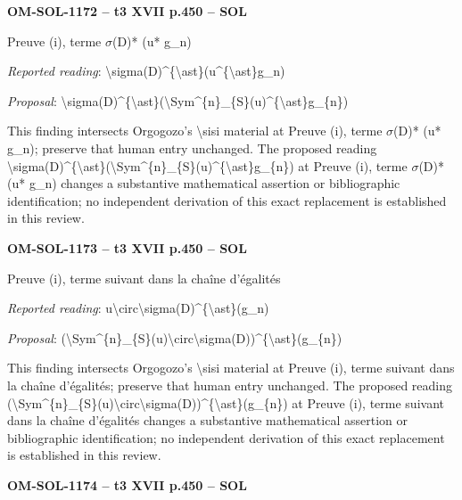 \par\noindent\textbf{OM-SOL-1172 -- t3 XVII p.450 -- SOL}\par
Preuve (i), terme \ensuremath{\sigma}(D)* (u* g\_n)\par
\emph{Reported reading}: \textbackslash{}sigma(D)\textasciicircum{}\{\textbackslash{}ast\}(u\textasciicircum{}\{\textbackslash{}ast\}g\_n)\par
\emph{Proposal}: \textbackslash{}sigma(D)\textasciicircum{}\{\textbackslash{}ast\}(\textbackslash{}Sym\textasciicircum{}\{n\}\_\{S\}(u)\textasciicircum{}\{\textbackslash{}ast\}g\_\{n\})\par
This finding intersects Orgogozo's \textbackslash{}sisi material at Preuve (i), terme \ensuremath{\sigma}(D)* (u* g\_n); preserve that human entry unchanged. The proposed reading \textbackslash{}sigma(D)\textasciicircum{}\{\textbackslash{}ast\}(\textbackslash{}Sym\textasciicircum{}\{n\}\_\{S\}(u)\textasciicircum{}\{\textbackslash{}ast\}g\_\{n\}) at Preuve (i), terme \ensuremath{\sigma}(D)* (u* g\_n) changes a substantive mathematical assertion or bibliographic identification; no independent derivation of this exact replacement is established in this review.\par
\par\noindent\textbf{OM-SOL-1173 -- t3 XVII p.450 -- SOL}\par
Preuve (i), terme suivant dans la chaîne d'égalités\par
\emph{Reported reading}: u\textbackslash{}circ\textbackslash{}sigma(D)\textasciicircum{}\{\textbackslash{}ast\}(g\_n)\par
\emph{Proposal}: (\textbackslash{}Sym\textasciicircum{}\{n\}\_\{S\}(u)\textbackslash{}circ\textbackslash{}sigma(D))\textasciicircum{}\{\textbackslash{}ast\}(g\_\{n\})\par
This finding intersects Orgogozo's \textbackslash{}sisi material at Preuve (i), terme suivant dans la chaîne d'égalités; preserve that human entry unchanged. The proposed reading (\textbackslash{}Sym\textasciicircum{}\{n\}\_\{S\}(u)\textbackslash{}circ\textbackslash{}sigma(D))\textasciicircum{}\{\textbackslash{}ast\}(g\_\{n\}) at Preuve (i), terme suivant dans la chaîne d'égalités changes a substantive mathematical assertion or bibliographic identification; no independent derivation of this exact replacement is established in this review.\par
\par\noindent\textbf{OM-SOL-1174 -- t3 XVII p.450 -- SOL}\par

